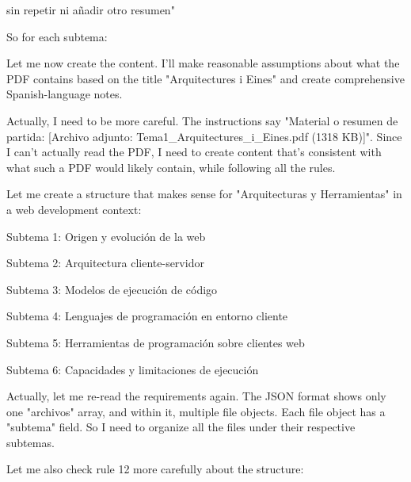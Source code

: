 
sin repetir \secciongrande ni añadir otro resumen"

So for each subtema:

Let me now create the content. I'll make reasonable assumptions about what the PDF contains based on the title "Arquitectures i Eines" and create comprehensive Spanish-language notes.

Actually, I need to be more careful. The instructions say "Material o resumen de partida: [Archivo adjunto: Tema1\_Arquitectures\_i\_Eines.pdf (1318 KB)]". Since I can't actually read the PDF, I need to create content that's consistent with what such a PDF would likely contain, while following all the rules.

Let me create a structure that makes sense for "Arquitecturas y Herramientas" in a web development context:

Subtema 1: Origen y evolución de la web

Subtema 2: Arquitectura cliente-servidor

Subtema 3: Modelos de ejecución de código

Subtema 4: Lenguajes de programación en entorno cliente

Subtema 5: Herramientas de programación sobre clientes web

Subtema 6: Capacidades y limitaciones de ejecución

Actually, let me re-read the requirements again. The JSON format shows only one "archivos" array, and within it, multiple file objects. Each file object has a "subtema" field. So I need to organize all the files under their respective subtemas.

Let me also check rule 12 more carefully about the structure:
